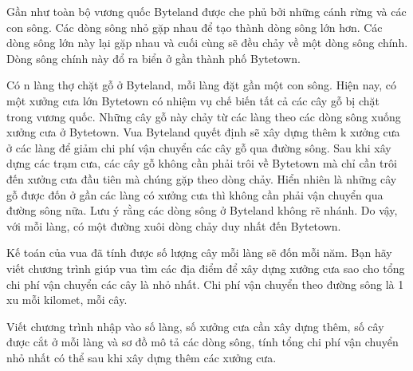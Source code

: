 Gần như toàn bộ vương quốc Byteland được che phủ bởi những cánh rừng và các con sông. Các dòng sông nhỏ gặp nhau để tạo thành dòng sông lớn hơn. Các dòng sông lớn này lại gặp nhau và cuối cùng sẽ đều chảy về một dòng sông chính. Dòng sông chính này đổ ra biển ở gần thành phố Bytetown.  

   Có n làng thợ chặt gỗ ở Byteland, mỗi làng đặt gần một con sông. Hiện nay, có một xưởng cưa lớn Bytetown có nhiệm vụ chế biến tất cả các cây gỗ bị chặt trong vương quốc. Những cây gỗ này chảy từ các làng theo các dòng sông xuống xưởng cưa ở Bytetown. Vua Byteland quyết định sẽ xây dựng thêm k xưởng cưa ở các làng để giảm chi phí vận chuyển các cây gỗ qua đường sông. Sau khi xây dựng các trạm cưa, các cây gỗ không cần phải trôi về Bytetown mà chỉ cần trôi đến xưởng cưa đầu tiên mà chúng gặp theo dòng chảy. Hiển nhiên là những cây gỗ được đốn ở gần các làng có xưởng cưa thì không cần phải vận chuyển qua đường sông nữa. Lưu ý rằng các dòng sông ở Byteland không rẽ nhánh. Do vậy, với mỗi làng, có một đường xuôi dòng chảy duy nhất đến Bytetown.  

   Kế toán của vua đã tính được số lượng cây mỗi làng sẽ đốn mỗi năm. Bạn hãy viết chương trình giúp vua tìm các địa điểm để xây dựng xưởng cưa sao cho tổng chi phí vận chuyển các cây là nhỏ nhất. Chi phí vận chuyển theo đường sông là 1 xu mỗi kilomet, mỗi cây.  

Viết chương trình nhập vào số làng, số xưởng cưa cần xây dựng thêm, số cây được cắt ở mỗi làng và sơ đồ mô tả các dòng sông, tính tổng chi phí vận chuyển nhỏ nhất có thể sau khi xây dựng thêm các xưởng cưa.